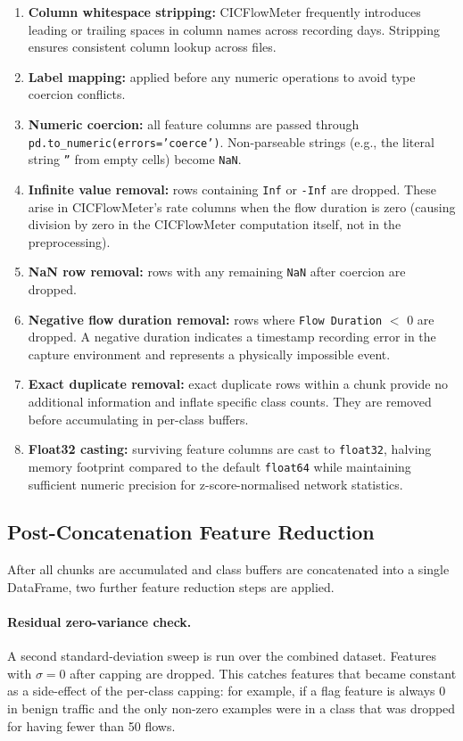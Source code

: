 \documentclass[12pt]{article}
\theoremstyle{plain}
\begin{document}
\begin{enumerate}
    \item \textbf{Column whitespace stripping:} CICFlowMeter frequently introduces leading or trailing spaces in column names across recording days. Stripping ensures consistent column lookup across files.
    \item \textbf{Label mapping:} applied before any numeric operations to avoid type coercion conflicts.
    \item \textbf{Numeric coercion:} all feature columns are passed through \texttt{pd.to\_numeric(errors='coerce')}. Non-parseable strings (e.g., the literal string \texttt{''} from empty cells) become \texttt{NaN}.
    \item \textbf{Infinite value removal:} rows containing \texttt{Inf} or \texttt{-Inf} are dropped. These arise in CICFlowMeter's rate columns when the flow duration is zero (causing division by zero in the CICFlowMeter computation itself, not in the preprocessing).
    \item \textbf{NaN row removal:} rows with any remaining \texttt{NaN} after coercion are dropped.
    \item \textbf{Negative flow duration removal:} rows where \texttt{Flow Duration} $<$ 0 are dropped. A negative duration indicates a timestamp recording error in the capture environment and represents a physically impossible event.
    \item \textbf{Exact duplicate removal:} exact duplicate rows within a chunk provide no additional information and inflate specific class counts. They are removed before accumulating in per-class buffers.
    \item \textbf{Float32 casting:} surviving feature columns are cast to \texttt{float32}, halving memory footprint compared to the default \texttt{float64} while maintaining sufficient numeric precision for z-score-normalised network statistics.
\end{enumerate}

\subsection{Post-Concatenation Feature Reduction}

After all chunks are accumulated and class buffers are concatenated into a single DataFrame, two further feature reduction steps are applied.

\paragraph{Residual zero-variance check.}
A second standard-deviation sweep is run over the combined dataset. Features with $\sigma = 0$ after capping are dropped. This catches features that became constant as a side-effect of the per-class capping: for example, if a flag feature is always 0 in benign traffic and the only non-zero examples were in a class that was dropped for having fewer than 50 flows.
\end{document}
